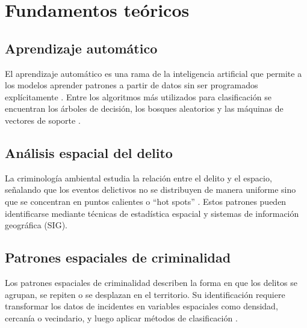 
\section{Fundamentos teóricos}

\label{sec:fundamentos}



\subsection{Aprendizaje automático}

El aprendizaje automático es una rama de la inteligencia artificial
que permite a los modelos aprender patrones a partir de datos sin
ser programados explícitamente \parencite{hastie2009elements}. Entre
los algoritmos más utilizados para clasificación se encuentran los
árboles de decisión, los bosques aleatorios y las máquinas de vectores
de soporte \parencite{geron2019hands}.

\subsection{Análisis espacial del delito}

La criminología ambiental estudia la relación entre el delito y el
espacio, señalando que los eventos delictivos no se distribuyen de
manera uniforme sino que se concentran en puntos calientes o ``hot
spots'' \parencite{eck2005mapping}. Estos patrones pueden identificarse
mediante técnicas de estadística espacial y sistemas de información
geográfica (SIG).

\subsection{Patrones espaciales de criminalidad}

Los patrones espaciales de criminalidad describen la forma en que
los delitos se agrupan, se repiten o se desplazan en el territorio.
Su identificación requiere transformar los datos de incidentes en
variables espaciales como densidad, cercanía o vecindario, y luego
aplicar métodos de clasificación \parencite{ratcliffe2008intelligence}.
